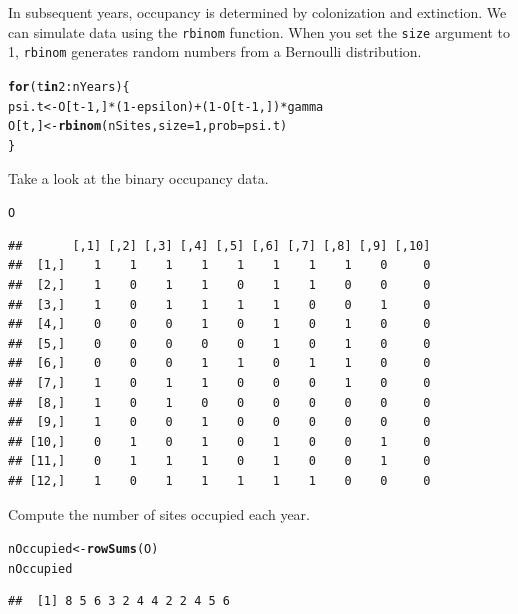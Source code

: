 \documentclass[12pt]{article}\usepackage[]{graphicx}\usepackage[]{xcolor}
\makeatletter
\newcommand{\hlnum}[1]{\textcolor[rgb]{0.686,0.059,0.569}{#1}}%
\newcommand{\hlopt}[1]{\textcolor[rgb]{0,0,0}{#1}}%
\newcommand{\hldef}[1]{\textcolor[rgb]{0.345,0.345,0.345}{#1}}%
\newcommand{\hlkwa}[1]{\textcolor[rgb]{0.161,0.373,0.58}{\textbf{#1}}}%
\newcommand{\hlkwb}[1]{\textcolor[rgb]{0.69,0.353,0.396}{#1}}%
\newcommand{\hlkwc}[1]{\textcolor[rgb]{0.333,0.667,0.333}{#1}}%
\newcommand{\hlkwd}[1]{\textcolor[rgb]{0.737,0.353,0.396}{\textbf{#1}}}%
\newenvironment{kframe}{%
 \def\at@end@of@kframe{}%
 \ifinner\ifhmode%
  \def\at@end@of@kframe{\end{minipage}}%
  \begin{minipage}{\columnwidth}%
 \fi\fi%
 \def\FrameCommand##1{\hskip\@totalleftmargin \hskip-\fboxsep
 \colorbox{shadecolor}{##1}\hskip-\fboxsep
     \hskip-\linewidth \hskip-\@totalleftmargin \hskip\columnwidth}%
 \MakeFramed {\advance\hsize-\width
   \@totalleftmargin\z@ \linewidth\hsize
   \@setminipage}}%
 {\par\unskip\endMakeFramed%
 \at@end@of@kframe}
\newenvironment{knitrout}{}{} %
\makeatother
\begin{document}
In subsequent years, occupancy is determined by colonization and
extinction. We can simulate data using the {\tt rbinom}
function. When you set the {\tt size} argument to 1, {\tt rbinom}
generates random numbers from a Bernoulli distribution.
\begin{knitrout}
\color{fgcolor}\begin{kframe}
\begin{alltt}
\hlkwa{for}\hldef{(t} \hlkwa{in} \hlnum{2}\hlopt{:}\hldef{nYears) \{}
    \hldef{psi.t} \hlkwb{<-} \hldef{O[t}\hlopt{-}\hlnum{1}\hldef{,]}\hlopt{*}\hldef{(}\hlnum{1}\hlopt{-}\hldef{epsilon)} \hlopt{+} \hldef{(}\hlnum{1}\hlopt{-}\hldef{O[t}\hlopt{-}\hlnum{1}\hldef{,])}\hlopt{*}\hldef{gamma}
    \hldef{O[t,]} \hlkwb{<-} \hlkwd{rbinom}\hldef{(nSites,} \hlkwc{size}\hldef{=}\hlnum{1}\hldef{,} \hlkwc{prob}\hldef{=psi.t)}
\hldef{\}}
\end{alltt}
\end{kframe}
\end{knitrout}

Take a look at the binary occupancy data.
\begin{knitrout}
\color{fgcolor}\begin{kframe}
\begin{alltt}
\hldef{O}
\end{alltt}
\begin{verbatim}
##       [,1] [,2] [,3] [,4] [,5] [,6] [,7] [,8] [,9] [,10]
##  [1,]    1    1    1    1    1    1    1    1    0     0
##  [2,]    1    0    1    1    0    1    1    0    0     0
##  [3,]    1    0    1    1    1    1    0    0    1     0
##  [4,]    0    0    0    1    0    1    0    1    0     0
##  [5,]    0    0    0    0    0    1    0    1    0     0
##  [6,]    0    0    0    1    1    0    1    1    0     0
##  [7,]    1    0    1    1    0    0    0    1    0     0
##  [8,]    1    0    1    0    0    0    0    0    0     0
##  [9,]    1    0    0    1    0    0    0    0    0     0
## [10,]    0    1    0    1    0    1    0    0    1     0
## [11,]    0    1    1    1    0    1    0    0    1     0
## [12,]    1    0    1    1    1    1    1    0    0     0
\end{verbatim}
\end{kframe}
\end{knitrout}

Compute the number of sites occupied each year.
\begin{knitrout}
\color{fgcolor}\begin{kframe}
\begin{alltt}
\hldef{nOccupied} \hlkwb{<-} \hlkwd{rowSums}\hldef{(O)}
\hldef{nOccupied}
\end{alltt}
\begin{verbatim}
##  [1] 8 5 6 3 2 4 4 2 2 4 5 6
\end{verbatim}
\end{kframe}
\end{knitrout}
\end{document}

